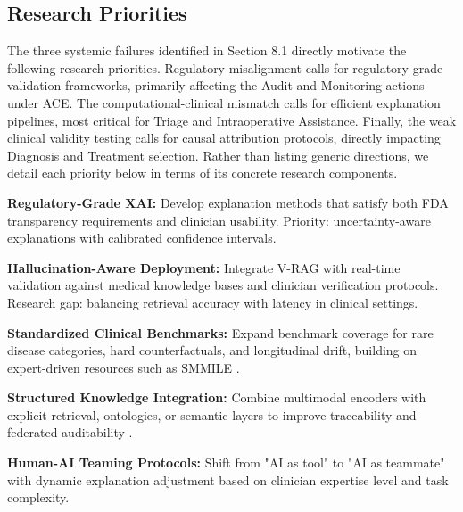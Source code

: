 \documentclass[pdflatex,sn-mathphys-num]{sn-jnl}%
\theoremstyle{thmstyleone}%
\theoremstyle{thmstyletwo}%
\theoremstyle{thmstylethree}%
\begin{document}
\begin{itemize}
\subsection{Research Priorities}
The three systemic failures identified in Section 8.1 directly motivate the following research priorities. Regulatory misalignment calls for regulatory-grade validation frameworks, primarily affecting the Audit and Monitoring actions under ACE. The computational-clinical mismatch calls for efficient explanation pipelines, most critical for Triage and Intraoperative Assistance. Finally, the weak clinical validity testing calls for causal attribution protocols, directly impacting Diagnosis and Treatment selection. Rather than listing generic directions, we detail each priority below in terms of its concrete research components.

\textbf{Regulatory-Grade XAI:} Develop explanation methods that satisfy both FDA transparency requirements and clinician usability. Priority: uncertainty-aware explanations with calibrated confidence intervals.
    
\textbf{Hallucination-Aware Deployment:} Integrate V-RAG with real-time validation against medical knowledge bases and clinician verification protocols. Research gap: balancing retrieval accuracy with latency in clinical settings.
    
\textbf{Standardized Clinical Benchmarks:} Expand benchmark coverage for rare disease categories, hard counterfactuals, and longitudinal drift, building on expert-driven resources such as SMMILE \cite{rieff2025smmileexpertdrivenbenchmarkmultimodal}.
    
\textbf{Structured Knowledge Integration:} Combine multimodal encoders with explicit retrieval, ontologies, or semantic layers to improve traceability and federated auditability \cite{info16060435}.
    
\textbf{Human-AI Teaming Protocols:} Shift from "AI as tool" to "AI as teammate" with dynamic explanation adjustment based on clinician expertise level and task complexity.


\end{itemize}
\end{document}
